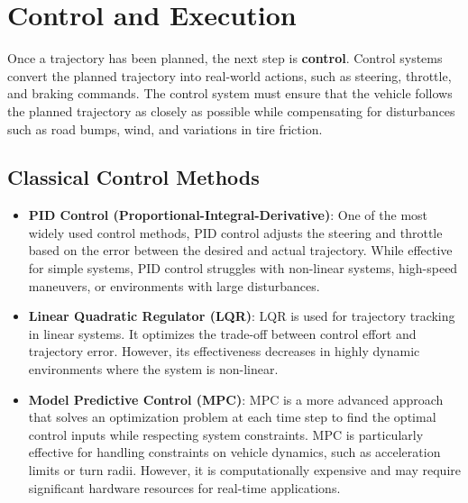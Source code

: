 \documentclass[12pt,a4paper]{article}
\begin{document}
\section{Control and Execution}
Once a trajectory has been planned, the next step is \textbf{control}. Control systems convert the planned trajectory into real-world actions, such as steering, throttle, and braking commands. The control system must ensure that the vehicle follows the planned trajectory as closely as possible while compensating for disturbances such as road bumps, wind, and variations in tire friction.

\subsection{Classical Control Methods}
\begin{itemize}
    \item \textbf{PID Control (Proportional-Integral-Derivative)}: One of the most widely used control methods, PID control adjusts the steering and throttle based on the error between the desired and actual trajectory. While effective for simple systems, PID control struggles with non-linear systems, high-speed maneuvers, or environments with large disturbances.
    \item \textbf{Linear Quadratic Regulator (LQR)}: LQR is used for trajectory tracking in linear systems. It optimizes the trade-off between control effort and trajectory error. However, its effectiveness decreases in highly dynamic environments where the system is non-linear.
    \item \textbf{Model Predictive Control (MPC)}: MPC is a more advanced approach that solves an optimization problem at each time step to find the optimal control inputs while respecting system constraints. MPC is particularly effective for handling constraints on vehicle dynamics, such as acceleration limits or turn radii. However, it is computationally expensive and may require significant hardware resources for real-time applications.
\end{itemize}
\end{document}
